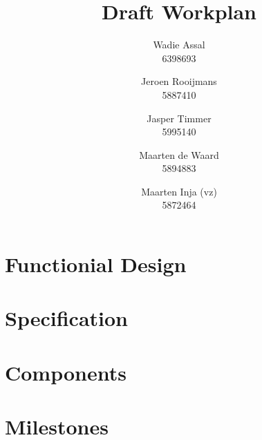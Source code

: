 \documentclass[a4paper, notitlepage]{article}
\title{Draft Workplan}
\author{Wadie Assal \\ 6398693 \and Jeroen Rooijmans \\ 5887410 \and Jasper Timmer \\ 5995140 \and Maarten de Waard \\ 5894883 \and Maarten Inja (vz) \\ 5872464}
\begin{document}
\maketitle

\section{Functionial Design}
%

\section{Specification}
%

\section{Components}
%

\section{Milestones}

\end{document}
